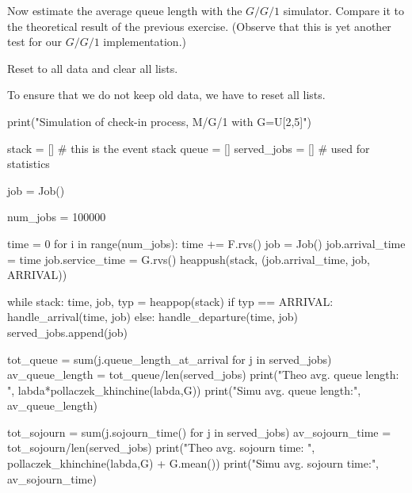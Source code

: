 \begin{exercise}
  Now estimate the average queue length with the $G/G/1$ simulator.
  Compare it to the theoretical result of the previous exercise.
  (Observe that this is yet another test for our $G/G/1$ implementation.)


  \begin{hint}
Reset to all data and clear all lists. 
  \end{hint}

  \begin{solution}
To ensure that we do not keep old data, we have to reset all lists. 

\begin{pyblock}
print("Simulation of check-in process, M/G/1 with G=U[2,5]")


stack = [] # this is the event stack
queue = []
served_jobs = [] # used for statistics

job = Job()

num_jobs = 100000

time = 0
for i in range(num_jobs):
    time += F.rvs()
    job = Job()
    job.arrival_time = time
    job.service_time = G.rvs()
    heappush(stack, (job.arrival_time, job, ARRIVAL))

while stack:
    time, job, typ = heappop(stack)
    if typ == ARRIVAL:
        handle_arrival(time, job)
    else:
        handle_departure(time, job)
        served_jobs.append(job)

tot_queue = sum(j.queue_length_at_arrival for j in served_jobs)
av_queue_length = tot_queue/len(served_jobs)
print("Theo avg. queue length: ", labda*pollaczek_khinchine(labda,G))
print("Simu avg. queue length:", av_queue_length)
      
tot_sojourn = sum(j.sojourn_time() for j in served_jobs)
av_sojourn_time = tot_sojourn/len(served_jobs)
print("Theo avg. sojourn time: ", pollaczek_khinchine(labda,G) + G.mean())
print("Simu avg. sojourn time:", av_sojourn_time)
  
\end{pyblock}

  \end{solution}

\end{exercise}

